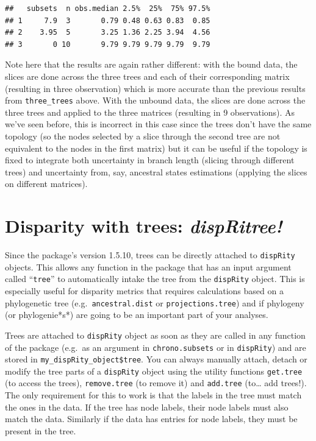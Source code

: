 \documentclass[
]{book}
\begin{document}
\begin{verbatim}
##   subsets  n obs.median 2.5%  25%  75% 97.5%
## 1     7.9  3       0.79 0.48 0.63 0.83  0.85
## 2    3.95  5       3.25 1.36 2.25 3.94  4.56
## 3       0 10       9.79 9.79 9.79 9.79  9.79
\end{verbatim}

Note here that the results are again rather different: with the bound data, the slices are done across the three trees and each of their corresponding matrix (resulting in three observation) which is more accurate than the previous results from \texttt{three\_trees} above.
With the unbound data, the slices are done across the three trees and applied to the three matrices (resulting in 9 observations).
As we've seen before, this is incorrect in this case since the trees don't have the same topology (so the nodes selected by a slice through the second tree are not equivalent to the nodes in the first matrix) but it can be useful if the topology is fixed to integrate both uncertainty in branch length (slicing through different trees) and uncertainty from, say, ancestral states estimations (applying the slices on different matrices).

\hypertarget{dispRitree}{%
\section{\texorpdfstring{Disparity with trees: \emph{dispRitree!}}{Disparity with trees: dispRitree!}}\label{dispRitree}}

Since the package's version 1.5.10, trees can be directly attached to \texttt{dispRity} objects.
This allows any function in the package that has an input argument called ``\texttt{tree}'' to automatically intake the tree from the \texttt{dispRity} object.
This is especially useful for disparity metrics that requires calculations based on a phylogenetic tree (e.g.~\texttt{ancestral.dist} or \texttt{projections.tree}) and if phylogeny (or phylogenie*s*) are going to be an important part of your analyses.

Trees are attached to \texttt{dispRity} object as soon as they are called in any function of the package (e.g.~as an argument in \texttt{chrono.subsets} or in \texttt{dispRity}) and are stored in \texttt{my\_dispRity\_object\$tree}.
You can always manually attach, detach or modify the tree parts of a \texttt{dispRity} object using the utility functions \texttt{get.tree} (to access the trees), \texttt{remove.tree} (to remove it) and \texttt{add.tree} (to\ldots{} add trees!).
The only requirement for this to work is that the labels in the tree must match the ones in the data.
If the tree has node labels, their node labels must also match the data.
Similarly if the data has entries for node labels, they must be present in the tree.
\end{document}

